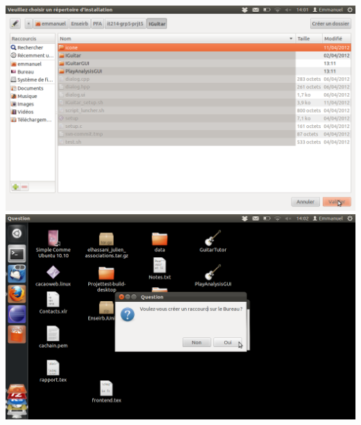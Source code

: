 \documentclass[a4paper,10pt]{article}
\begin{document}
\\
\includegraphics[scale=0.4]{./choix_repertory.png}
\includegraphics[scale=0.4]{./install_fin.png}
\end{document}
